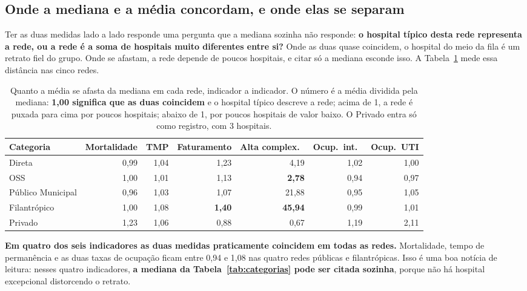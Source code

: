 \subsection*{Onde a mediana e a média concordam, e onde elas se separam}

Ter as duas medidas lado a lado responde uma pergunta que a mediana sozinha
não responde: \textbf{o hospital típico desta rede representa a rede, ou a
rede é a soma de hospitais muito diferentes entre si?} Onde as duas quase
coincidem, o hospital do meio da fila é um retrato fiel do grupo. Onde se
afastam, a rede depende de poucos hospitais, e citar só a mediana esconde
isso. A Tabela~\ref{tab:razaomediamediana} mede essa distância nas cinco
redes.

\begin{table}[H]
\centering
\caption{Quanto a média se afasta da mediana em cada rede, indicador a
indicador. O número é a média dividida pela mediana: \textbf{1,00 significa
que as duas coincidem} e o hospital típico descreve a rede; acima de 1, a
rede é puxada para cima por poucos hospitais; abaixo de 1, por poucos
hospitais de valor baixo. O Privado entra só como registro, com 3
hospitais.}
\label{tab:razaomediamediana}
\small
\setlength{\tabcolsep}{5pt}
\begin{tabular}{lrrrrrr}
\toprule
Categoria & Mortalidade & TMP & Faturamento & Alta complex.\ &
Ocup.\ int.\ & Ocup.\ UTI \\
\midrule
Direta            & 0,99 & 1,04 & 1,23 & 4,19  & 1,02 & 1,00 \\
OSS               & 1,00 & 1,01 & 1,13 & \textbf{2,78}  & 0,94 & 0,97 \\
Público Municipal & 0,96 & 1,03 & 1,07 & 21,88 & 0,95 & 1,05 \\
Filantrópico      & 1,00 & 1,08 & \textbf{1,40} & \textbf{45,94} & 0,99 & 1,01 \\
Privado           & 1,23 & 1,06 & 0,88 & 0,67  & 1,19 & 2,11 \\
\bottomrule
\end{tabular}
\end{table}


\textbf{Em quatro dos seis indicadores as duas medidas praticamente
coincidem em todas as redes.} Mortalidade, tempo de permanência e as duas
taxas de ocupação ficam entre 0,94 e 1,08 nas quatro redes públicas e
filantrópicas. Isso é uma boa notícia de leitura: nesses quatro
indicadores, \textbf{a mediana da Tabela~\ref{tab:categorias} pode ser
citada sozinha}, porque não há hospital excepcional distorcendo o retrato.

